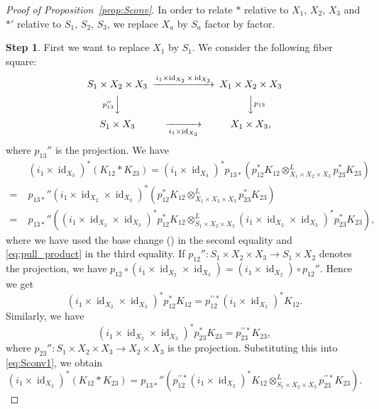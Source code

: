 \documentclass[12pt]{amsart}
\theoremstyle{definition}
\theoremstyle{remark}
\numberwithin{equation}{subsection}
\newcommand{\propref}[1]{Proposition~\ref{#1}}
\newcommand{\id}{\operatorname{id}}
\begin{document}
\begin{proof}[Proof of \propref{prop:Sconv}]
In order to relate $*$ relative to $X_1$, $X_2$, $X_3$
and $*'$ relative to $S_1$, $S_2$, $S_3$,
we replace $X_a$ by $S_a$ factor by factor.

{\bf Step 1}.
First we want to replace $X_1$ by $S_1$. 
We consider the following fiber square:
\begin{equation*}
\begin{CD}
S_1\times X_2\times X_3 @>{i_1\times\id_{X_2}\times\id_{X_3}}>>
X_1\times X_2\times X_3 \\
@V{p_{13}''}VV @VV{p_{13}}V \\
S_1\times X_3 @>>{i_1\times\id_{X_3}}> X_1\times X_3,
\end{CD}
\end{equation*}
where $p_{13}''$ is the projection. We have
\begin{equation}
\label{eq:Sconv1}
\begin{split}
 & (i_1\times\id_{X_3})^* (K_{12} * K_{23}) = 
(i_1\times\id_{X_3})^* p_{13*}
\left( p_{12}^* K_{12}\otimes^L_{X_1\times X_2\times X_3} p_{23}^*
  K_{23}\right) \\ %
 =\; & p_{13*}''(i_1\times\id_{X_2}\times\id_{X_3})^*
 \left(p_{12}^* K_{12}\otimes^L_{X_1\times X_2\times X_3} p_{23}^*
  K_{23}\right) \\
 =\; & p_{13*}'' \left(
   (i_1\times\id_{X_2}\times\id_{X_3})^* p_{12}^* K_{12}
   \otimes^L_{S_1\times X_2\times X_3}
   (i_1\times\id_{X_2}\times\id_{X_3})^* p_{23}^* K_{23}\right),
\end{split}
\end{equation}
where we have used the base change (\cite[5.3.15]{Gi-book}) in the
second equality and 
\eqref{eq:pull_product} in the third equality.
If $p_{12}''\colon S_1\times X_2\times X_3\to S_1\times X_2$ denotes
the projection, we have
$p_{12}\circ (i_1\times\id_{X_2}\times\id_{X_3})
= (i_1\times\id_{X_2})\circ p_{12}''$. Hence we get
\begin{equation*}
  (i_1\times\id_{X_2}\times\id_{X_3})^* p_{12}^* K_{12}
  =  p_{12}^{\prime\prime*}(i_1\times\id_{X_2})^* K_{12}.
\end{equation*}
Similarly, we have
\begin{equation*}
  (i_1\times\id_{X_2}\times\id_{X_3})^* p_{23}^* K_{23}
  = p_{23}^{\prime\prime*} K_{23},
\end{equation*}
where $p_{23}''\colon S_1\times X_2\times X_3\to X_2\times X_3$ is the 
projection. Substituting this into \eqref{eq:Sconv1}, we obtain
\begin{equation}
\label{eq:Sconv2}
  (i_1\times\id_{X_3})^* (K_{12} * K_{23}) =
  p_{13*}'' \left( p_{12}^{\prime\prime*}(i_1\times\id_{X_2})^* K_{12}
    \otimes^L_{S_1\times X_2\times X_3}
    p_{23}^{\prime\prime*} K_{23}\right).
\end{equation}


\end{proof}
\end{document}
